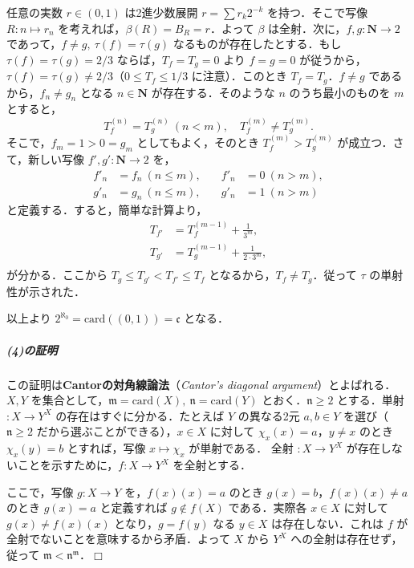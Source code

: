 \documentclass[b5paper,pandoc]{bxjsarticle}
\let\oldsubparagraph\subparagraph
\renewcommand{\subparagraph}[1]{\oldsubparagraph{#1}\mbox{}}
\def\lt{<}
\def\gt{>}
\begin{document}
任意の実数 \(r \in (0, 1)\) は2進少数展開 \(r = \sum r_k 2^{-k}\)
を持つ．そこで写像 \(R \colon n \mapsto r_n\)
を考えれば，\(\beta(R) = B_R = r\)．よって \(\beta\)
は全射．次に，\(f, g \colon \boldsymbol N \to 2\)
であって，\(f \neq g,\ \tau(f) = \tau(g)\)
なるものが存在したとする．もし \(\tau(f) = \tau(g) = 2/3\)
ならば，\(T_f = T_g = 0\) より \(f = g = 0\)
が従うから，\(\tau(f) = \tau(g) \neq 2/3\)（\(0 \leqslant T_f \leqslant 1/3\)
に注意）．このとき \(T_f = T_g\)．\(f \neq g\)
であるから，\(f_n \neq g_n\) となる \(n \in \boldsymbol N\)
が存在する．そのような \(n\) のうち最小のものを \(m\) とすると， \[
T_f^{(n)} = T_g^{(n)} \ (n \lt m), \quad T_f^{(m)} \neq T_g^{(m)}.
\] そこで，\(f_m = 1 \gt 0 = g_m\) としてもよく，そのとき
\(T_f^{(m)} \gt T_g^{(m)}\) が成立つ．さて，新しい写像
\(f', g' \colon \boldsymbol N \to 2\) を， \begin{align*}
f'_n &= f_n \ (n \leqslant m), &\quad f'_n &= 0 \ (n \gt m),\\
g'_n &= g_n \ (n \leqslant m), &\quad g'_n &= 1 \ (n \gt m)
\end{align*} と定義する．すると，簡単な計算より， \begin{align*}
T_{f'} &= T_f^{(m - 1)} + \frac 1{3^m},\\
T_{g'} &= T_g^{(m - 1)} + \frac 1{2 \cdot 3^m},\\
\end{align*} が分かる．ここから
\(T_g \leqslant T_{g'} \lt T_{f'} \leqslant T_f\)
となるから，\(T_f \neq T_g\)．従って \(\tau\) の単射性が示された．

以上より \(2^{\aleph_0} = \mathrm{card}((0, 1)) = \mathfrak c\) となる．

\hypertarget{ux306eux8a3cux660e-3}{%
\subparagraph{(4)の証明}\label{ux306eux8a3cux660e-3}}

この証明は\textbf{Cantorの対角線論法}（\emph{Cantor's diagonal
argument}）とよばれる．\(X, Y\)
を集合として，\(\mathfrak m = \mathrm{card}(X),\ \mathfrak n = \mathrm{card}(Y)\)
とおく．\(\mathfrak n \geqslant 2\) とする．単射 \(\colon X \to Y^X\)
の存在はすぐに分かる．たとえば \(Y\) の異なる2元 \(a, b \in Y\)
を選び（\(\mathfrak n \geqslant 2\)
だから選ぶことができる），\(x \in X\) に対して
\(\chi_x(x) = a\)，\(y \neq x\) のとき \(\chi_x(y) = b\) とすれば，写像
\(x \mapsto \chi_x\) が単射である． 全射 \(\colon X \to Y^X\)
が存在しないことを示すために，\(f \colon X \to Y^X\) を全射とする．

ここで，写像 \(g \colon X \to Y\) を，\(f(x)(x) = a\) のとき
\(g(x) = b\)，\(f(x)(x) \neq a\) のとき \(g(x) = a\) と定義すれば
\(g \notin f(X)\) である．実際各 \(x \in X\) に対して
\(g(x) \neq f(x)(x)\) となり，\(g = f(y)\) なる \(y \in X\)
は存在しない．これは \(f\) が全射でないことを意味するから矛盾．よって
\(X\) から \(Y^X\) への全射は存在せず，従って
\(\mathfrak m \lt \mathfrak n^{\mathfrak m}\)．\(\Box\)
\end{document}
